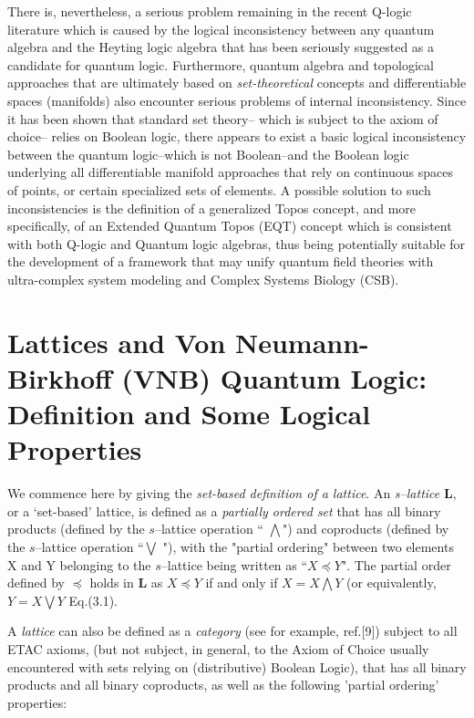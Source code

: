 \documentclass[12pt]{article}
\theoremstyle{plain}
\theoremstyle{definition}
\numberwithin{equation}{section}
\begin{document}
There is, nevertheless, a serious problem remaining in the recent Q-logic literature which is caused by the logical inconsistency between any quantum algebra and the Heyting logic algebra that has been seriously suggested as a candidate for quantum logic. Furthermore, quantum algebra and topological approaches that are ultimately based on \emph{set-theoretical} concepts and differentiable spaces (manifolds) also encounter serious problems of internal inconsistency. Since it has been shown that standard set theory-- which is subject to the axiom of choice-- relies on Boolean logic, there appears to exist a basic logical inconsistency between the quantum logic--which is not Boolean--and the Boolean logic underlying all differentiable manifold approaches that rely on continuous spaces of points, or certain specialized sets of elements. A possible solution to such inconsistencies is the definition of a generalized Topos concept, and more specifically, of an Extended Quantum Topos (EQT) concept which is consistent with both Q-logic and Quantum logic algebras, thus being potentially suitable for the development of a framework that may unify quantum field theories with ultra-complex system modeling and Complex Systems Biology (CSB).


\section{Lattices and Von Neumann-Birkhoff (VNB) Quantum Logic: Definition and Some Logical Properties}


We commence here by giving the \emph{set-based definition of a lattice}. An \emph{s--lattice} $\mathbf{L}$, or a `set-based' lattice, is defined as a \emph{partially ordered set} that has all
binary products (defined by the $s$--lattice operation `` $\bigwedge$") and coproducts (defined by the $s$--lattice operation ``$ \bigvee$ "), with the "partial ordering" between two
elements X and Y belonging to the $s$--lattice being written as ``$X \preceq Y$". The partial order defined by $\preceq$ holds in \textbf{L }as $X \preceq  Y$ if and only if
 $X = X \bigwedge Y $ (or equivalently, $Y = X \bigvee Y $ Eq.(3.1).

 A \emph{lattice} can also be defined as a \emph{category} (see for example, ref.[9]) subject to all ETAC axioms, (but not subject, in general, to the Axiom of Choice usually encountered with sets relying on (distributive) Boolean Logic), that has all binary products and all binary coproducts, as well as the following 'partial ordering' properties:
\end{document}
